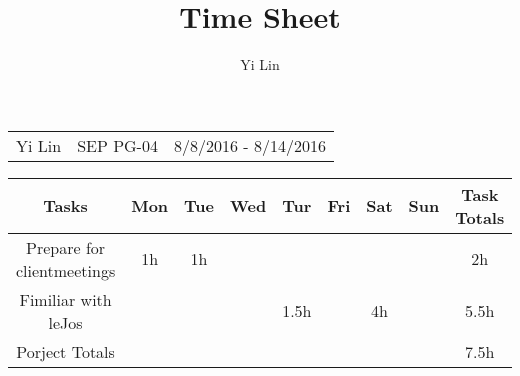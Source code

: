 \documentclass[a4paper]{article}
\title{Time Sheet}
\author{Yi Lin}
\begin{document}
\maketitle

\begin{table}[h] 
\begin{tabular}{l c r}
Yi Lin & SEP PG-04 & 8/8/2016 - 8/14/2016    \\
\end{tabular}
\end{table}

\begin{table}[h]
\centering
\begin{tabular}{ccccccccc}\renewcommand{\arraystretch}{4}
Tasks & Mon & Tue & Wed & Tur & Fri & Sat & Sun & Task Totals \\\hline
Prepare for clientmeetings & 1h & 1h & & & & & & 2h \\
Fimiliar with leJos & & & & 1.5h & & 4h & & 5.5h\\\hline
Porject Totals & & & & & & & & 7.5h\\\hline

\end{tabular}
\end{table}
\end{document}
